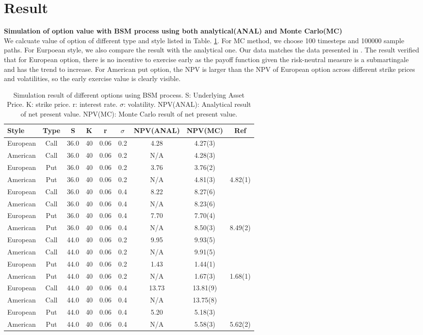 \documentclass[a4paper]{article}
\begin{document}
\section{Result}
{\bf Simulation of option value with BSM process using both analytical(ANAL) and Monte Carlo(MC)}\\
We calcuate value of  option of different type and style listed in Table. \ref{option_bsm}. For MC method, we choose 100 timesteps and 100000 sample paths. For Eurpoean style, we also compare the result with the analytical one. Our data matches the data presented in \cite{americanoption}. The result verified that for European option, there is no incentive to exercise early as the payoff function given the risk-neutral measure is a submartingale and has the trend to increase. For American put option, the NPV is larger than the NPV of European option across different strike prices and volatilities, so the early exercise value is clearly visible.
\begin{table}
	\begin{tabular} { l  c  c   c  c  c       c       c        c  }
		Style 	 & Type & S  & K & r & $\sigma$ & NPV(ANAL) & NPV(MC) &Ref\cite{americanoption}\\
	\hline 
		European & Call & 36.0 & 40 & 0.06 & 0.2 & 4.28 & 4.27(3) & \\
		American & Call & 36.0 & 40 & 0.06 & 0.2 & N/A  & 4.28(3) &\\
		European & Put  & 36.0 & 40 & 0.06 & 0.2 & 3.76 & 3.76(2) &\\
		American & Put  & 36.0 & 40 & 0.06 & 0.2 & N/A  & 4.81(3) & 4.82(1)\\
		European & Call & 36.0 & 40 & 0.06 & 0.4 & 8.22 & 8.27(6) &\\
		American & Call & 36.0 & 40 & 0.06 & 0.4 & N/A  & 8.23(6) &\\
		European & Put  & 36.0 & 40 & 0.06 & 0.4 & 7.70 & 7.70(4) &\\
		American & Put  & 36.0 & 40 & 0.06 & 0.4 & N/A  & 8.50(3) & 8.49(2)\\
		European & Call & 44.0 & 40 & 0.06 & 0.2 & 9.95 & 9.93(5) &\\
		American & Call & 44.0 & 40 & 0.06 & 0.2 & N/A  & 9.91(5) &\\
		European & Put  & 44.0 & 40 & 0.06 & 0.2 & 1.43 & 1.44(1) &\\
		American & Put  & 44.0 & 40 & 0.06 & 0.2 & N/A  & 1.67(3) & 1.68(1)\\
		European & Call & 44.0 & 40 & 0.06 & 0.4 & 13.73 & 13.81(9) &\\
		American & Call & 44.0 & 40 & 0.06 & 0.4 & N/A  & 13.75(8) &\\
		European & Put  & 44.0 & 40 & 0.06 & 0.4 & 5.20 &  5.18(3)&\\
		American & Put  & 44.0 & 40 & 0.06 & 0.4 & N/A  &  5.58(3)& 5.62(2)\\
	\hline
	\end{tabular}\\
\caption{Simulation result of different options using BSM process.
	S: Underlying Asset Price. K: strike price. r: interest rate. 
	$\sigma$: volatility. NPV(ANAL): Analytical result of net present value.
	NPV(MC): Monte Carlo result of net present value.}\label{option_bsm}
\end{table}
\end{document}
